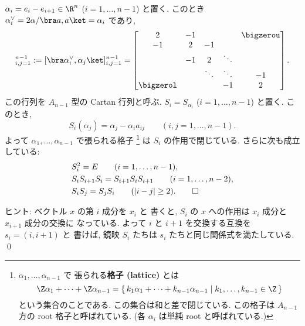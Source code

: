 \documentclass[12pt,twoside]{jarticle}
\begin{document}
\begin{question}
\label{q:W(A_l)}
  $\alpha_i = e_i - e_{i+1} \in\R^n$ ($i=1,\dots,n-1$) と置く.
  このとき $\alpha_i^\vee = 2\alpha/\bra a,a\ket = \alpha_i$ であり,
  \begin{equation*}
    [a_{ij}]_{i,j=1}^{n-1} :=
    [\bra \alpha_i^\vee,\alpha_j\ket]_{i,j=1}^{n-1} = 
    \begin{bmatrix}
       2 & -1 &        & & \bigzerou \\
      -1 &  2 &   -1   &        &    \\
         & -1 &    2   & \ddots &    \\
         &    & \ddots & \ddots & -1 \\
      \bigzerol & &    &   -1   &  2 \\
    \end{bmatrix}.
  \end{equation*}
  この行列を $A_{n-1}$ 型の Cartan 行列と呼ぶ.  
  $S_i = S_{\alpha_i}$ ($i=1,\dots,n-1$) と置く.
  このとき,
  \begin{equation*}
    S_i(\alpha_j) = \alpha_j - \alpha_i a_{ij} 
    \qquad (i,j=1,\dots,n-1).
  \end{equation*}
  よって $\alpha_1,\dots,\alpha_{n-1}$ で張られる格子%
  \footnote{$\alpha_1,\dots,\alpha_{n-1}$ で
    張られる{\bf 格子 (lattice)} とは
    \begin{equation*}
      \Z\alpha_1 + \cdots + \Z\alpha_{n-1}
      = \{\, k_1\alpha_1 + \cdots + k_{n-1}\alpha_{n-1} 
        \mid k_1,\dots,k_{n-1}\in\Z \,\}
    \end{equation*}
    という集合のことである. この集合は和と差で閉じている.
    この格子は $A_{n-1}$ 方の root 格子と呼ばれている.
    (各 $\alpha_i$ は単純 root と呼ばれている.)}
  は $S_i$ の作用で閉じている.  さらに次も成立している:
  \begin{align*}
    &
    S_i^2 = E \qquad (i=1,\dots,n-1),
    \\ &
    S_iS_{i+1}S_i = S_{i+1}S_iS_{i+1} \qquad (i=1,\dots,n-2),
    \\ &
    S_iS_j = S_jS_i \qquad (|i-j|\ge 2).
    \qed
  \end{align*}
\end{question}

\noindent
ヒント: ベクトル $x$ の第 $i$ 成分を $x_i$ と
書くと, $S_i$ の $x$ への作用は $x_i$ 成分と $x_{i+1}$ 成分の交換に
なっている.  よって $i$ と $i+1$ を交換する互換を $s_i=(i,i+1)$ と
書けば, 鏡映 $S_i$ たちは $s_i$ たちと同じ関係式を満たしている.
\qed
\end{document}
